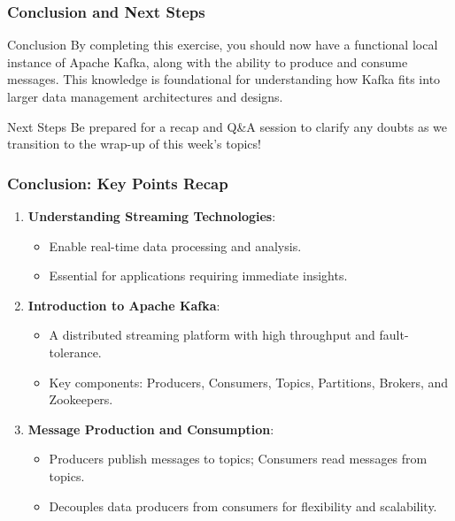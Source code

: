 \documentclass[aspectratio=169]{beamer}
\begin{document}
\begin{frame}[fragile]
    \frametitle{Conclusion and Next Steps}
    \begin{block}{Conclusion}
        By completing this exercise, you should now have a functional local instance of Apache Kafka, along with the ability to produce and consume messages. This knowledge is foundational for understanding how Kafka fits into larger data management architectures and designs.
    \end{block}

    \begin{block}{Next Steps}
        Be prepared for a recap and Q\&A session to clarify any doubts as we transition to the wrap-up of this week’s topics!
    \end{block}
\end{frame}

\begin{frame}[fragile]
    \frametitle{Conclusion: Key Points Recap}
    
    \begin{enumerate}
        \item \textbf{Understanding Streaming Technologies}:
            \begin{itemize}
                \item Enable real-time data processing and analysis.
                \item Essential for applications requiring immediate insights.
            \end{itemize}
        
        \item \textbf{Introduction to Apache Kafka}:
            \begin{itemize}
                \item A distributed streaming platform with high throughput and fault-tolerance.
                \item Key components: Producers, Consumers, Topics, Partitions, Brokers, and Zookeepers.
            \end{itemize}
        
        \item \textbf{Message Production and Consumption}:
            \begin{itemize}
                \item Producers publish messages to topics; Consumers read messages from topics.
                \item Decouples data producers from consumers for flexibility and scalability.
            \end{itemize}
    \end{enumerate}
\end{frame}
\end{document}
